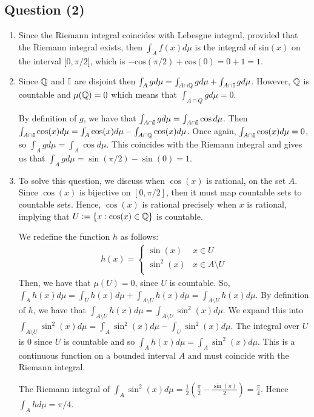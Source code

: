 \documentclass{article}
\begin{document}
\begin{center}
\section*{Question (2)}
\end{center}


\begin{enumerate}[label=(\roman*)]
    \item Since the Riemann integral coincides with Lebesgue integral, provided that the Riemann integral exists, then $\int_A f(x) d\mu$ is the integral of sin$(x)$ on the interval [$0, \pi/2$], which is $-\text{cos}(\pi/2) + \text{cos}(0) = 0 + 1 = 1$.

	\item Since $\mathbb{Q}$ and $\mathbb{I}$ are disjoint then $\int_A g d\mu = \int_{A \cap \mathbb{Q}} g d\mu + \int_{A \cap \mathbb{I}} g d\mu$. 
	However, $\mathbb{Q}$ is countable and $\mu(\mathbb{Q}) = 0$ which means that $\int_{A \cap Q} g d\mu = 0$. \newline 
	
	By definition of $g$, we have that $\int_{A \cap \mathbb{I}} g d\mu = \int_{A \cap \mathbb{I}} \cos d\mu$. Then $\int_{A \cap \mathbb{I}} \cos(x) d\mu = \int_A \cos(x) d\mu - \int_{A \cap \mathbb{Q}} \cos(x) d\mu$. Once again, $\int_{A \cap \mathbb{I}} \cos(x) d\mu = 0$, so $\int_A g d\mu = \int_A \cos d\mu$. This coincides with the Riemann integral and gives us that $\int_A g d\mu = \sin(\pi/2) - \sin(0) = 1$.

    \item To solve this question, we discuss when $\cos(x)$ is rational, on the set $A$. Since $\cos(x)$ is bijective on $[0, \pi/2]$, then it must map countable sets to countable sets. Hence, $\cos(x)$ is rational precisely when $x$ is rational, implying that $U := \{ x : \cos(x) \in \mathbb{Q} \}$ is countable.
    
    We redefine the function $h$ as follows: 
    \begin{align*}
    	h(x) = 
    	\begin{cases}
    		\sin(x) & x \in U \\ 
    		\sin^2(x) & x \in A \setminus U \\ 
 		\end{cases}
    \end{align*}
	Then, we have that $\mu(U) = 0$, since $U$ is countable. So, $\int_A h(x) d\mu = \int_U h(x) d\mu + \int_{A \setminus U} h(x) d\mu = \int_{A \setminus U} h(x) d\mu$. By definition of $h$, we have that $\int_{A \setminus U} h(x) d\mu = \int_{A \setminus U} \sin^2(x) d\mu$. We expand this into $\int_{A \setminus U} \sin^2(x) d\mu = \int_{A} \sin^2(x) d\mu - \int_{U} \sin^2(x) d\mu$. The integral over $U$ is $0$ since $U$ is countable and so $\int_A h(x) d\mu = \int_A \sin^2(x) d\mu$. This is a continuous function on a bounded interval $A$ and must coincide with the Riemann integral. \newline
	
	The Riemann integral of $\int_A \sin^2(x) d\mu = \frac{1}{2}(\frac{\pi}{2} - \frac{\sin(\pi)}{2}) = \frac{\pi}{4}$. Hence $\int_A h d\mu = \pi/4$. 
\end{enumerate}
\end{document}
